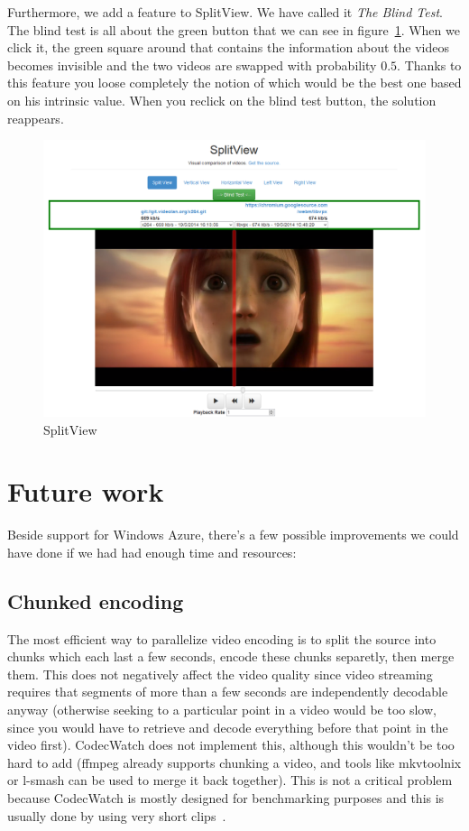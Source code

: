 \documentclass[a4paper,12pt]{article}
\begin{document}
Furthermore, we add a feature to SplitView. We have called it \emph{The Blind Test}. The blind test is all about the green button that we can see in figure~\ref{fig:split1}. When we click it, the green square around that contains the information about the videos becomes invisible and the two videos are swapped with probability $0.5$. Thanks to this feature you loose completely the notion of which would be the best one based on his intrinsic value. When you reclick on the blind test button, the solution reappears.

\begin{figure}[!h] \centering
  \includegraphics[width=1\textwidth]{figures/split1.png}
  \caption{SplitView}
  \label{fig:split1}
\end{figure}

\section{Future work}
Beside support for Windows Azure, there's a few possible improvements we could
have done if we had had enough time and resources:
\subsection{Chunked encoding}
The most efficient way to parallelize video encoding is to split the source into
chunks which each last a few seconds, encode these chunks separetly, then merge
them. This does not negatively affect the video quality since video streaming
requires that segments of more than a few seconds are independently decodable
anyway (otherwise seeking to a particular point in a video would be too slow,
since you would have to retrieve and decode everything before that point in the
video first). CodecWatch does not implement this, although this wouldn't be too
hard to add (ffmpeg already supports chunking a video, and tools like mkvtoolnix
or l-smash can be used to merge it back together). This is not a critical
problem because CodecWatch is mostly designed for benchmarking purposes and this
is usually done by using very short clips~\cite{derf}.
\end{document}
